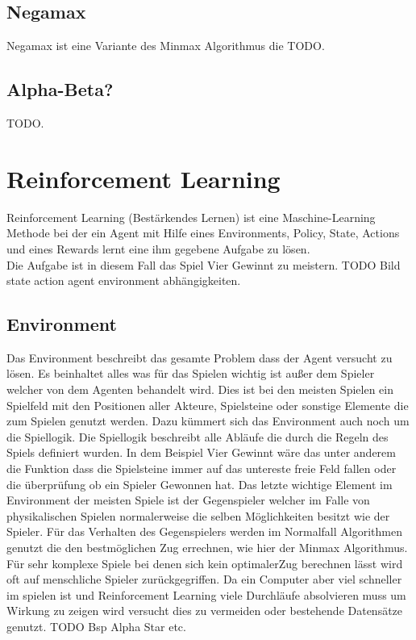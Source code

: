 \subsection{Negamax}
Negamax ist eine Variante des Minmax Algorithmus die \colorbox{red!30}{TODO}.

\subsection{Alpha-Beta?}
\colorbox{red!30}{TODO}.

\section{Reinforcement Learning}
Reinforcement Learning (Bestärkendes Lernen) ist eine Maschine-Learning Methode bei der ein Agent mit Hilfe eines Environments, Policy, State, Actions und eines Rewards lernt eine ihm gegebene Aufgabe zu lösen. \\
Die Aufgabe ist in diesem Fall das Spiel Vier Gewinnt zu meistern.
\colorbox{red!30}{TODO Bild state action agent environment abhängigkeiten}.

\subsection{Environment}
Das Environment beschreibt das gesamte Problem dass der Agent versucht zu lösen. Es beinhaltet alles was für das Spielen wichtig ist außer dem Spieler welcher von dem Agenten behandelt wird.  Dies ist bei den meisten Spielen ein Spielfeld mit den Positionen aller Akteure, Spielsteine oder sonstige Elemente die zum Spielen genutzt werden. Dazu kümmert sich das Environment auch noch um die Spiellogik. Die Spiellogik beschreibt alle Abläufe die durch die Regeln des Spiels definiert wurden. In dem Beispiel Vier Gewinnt wäre das unter anderem die Funktion dass die Spielsteine immer auf das untereste freie Feld fallen oder die überprüfung ob ein Spieler Gewonnen hat. Das letzte wichtige Element im Environment der meisten Spiele ist der Gegenspieler welcher im Falle von physikalischen Spielen normalerweise die selben Möglichkeiten besitzt wie der Spieler. Für das Verhalten des Gegenspielers werden im Normalfall Algorithmen genutzt die den bestmöglichen Zug errechnen, wie hier der Minmax Algorithmus. Für sehr komplexe Spiele bei denen sich kein optimalerZug berechnen lässt wird oft auf menschliche Spieler zurückgegriffen. Da ein Computer aber viel schneller im spielen ist und Reinforcement Learning viele Durchläufe absolvieren muss um Wirkung zu zeigen wird versucht dies zu vermeiden oder bestehende Datensätze genutzt. \colorbox{red!30}{TODO Bsp Alpha Star etc}.



